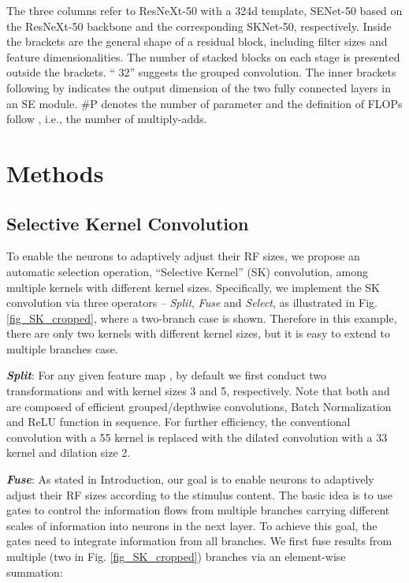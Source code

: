 \documentclass[10pt,twocolumn,letterpaper]{article}
\begin{document}
\begin{table*}
		\vspace{+4pt}
		\caption{The three columns refer to ResNeXt-50 with a 324d template, SENet-50 based on the ResNeXt-50 backbone and the corresponding SKNet-50, respectively. Inside the brackets are the general shape of a residual block, including filter sizes and feature dimensionalities. The number of stacked blocks on each stage is presented outside the brackets. `` 32'' suggests the grouped convolution. The inner brackets following by  indicates the output dimension of the two fully connected layers in an SE module. \#P denotes the number of parameter and the definition of FLOPs follow  \cite{zhang1707shufflenet}, i.e., the number of multiply-adds.}
		\label{tab_arch}
		\vspace{-2pt}
	\end{table*}
	
	\section{Methods}
	
	\subsection{Selective Kernel Convolution}
	To enable the neurons to adaptively adjust their RF sizes,  we propose an automatic selection operation, ``Selective Kernel'' (SK) convolution, among multiple kernels with different kernel sizes.
	Specifically, we implement the SK convolution via three operators -- \emph{Split}, \emph{Fuse} and \emph{Select}, as illustrated in Fig. \ref{fig_SK_cropped}, where a two-branch case is shown. Therefore in this example, there are only two kernels with different kernel sizes, but it is easy to extend to multiple branches case.
	
	\textbf{\emph{Split}}: For any given feature map , by default we first conduct two transformations  and  with kernel sizes 3 and 5, respectively. Note that both  and  are composed of efficient grouped/depthwise convolutions, Batch Normalization \cite{ioffe2015batch} and ReLU \cite{nair2010rectified} function in sequence. For further efficiency, the conventional convolution with a 55 kernel is replaced with the dilated convolution with a 33 kernel and dilation size 2. 
	
	\textbf{\emph{Fuse}}: As stated in Introduction, our goal is to enable neurons to adaptively adjust their RF sizes according to the stimulus content. The basic idea is to use gates to control the information flows from multiple branches carrying different scales of information into neurons in the next layer. To achieve this goal, the gates need to integrate information from all branches. We first fuse results from multiple (two in Fig. \ref{fig_SK_cropped}) branches via an element-wise summation: 
	
\end{document}
